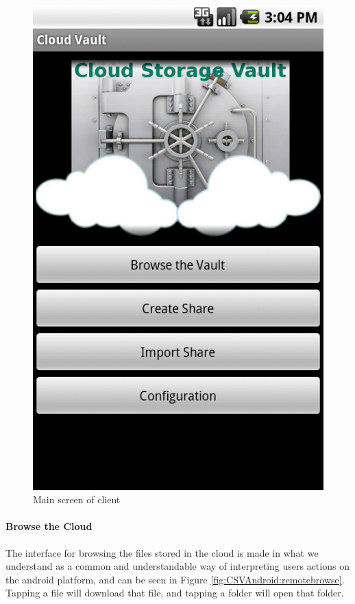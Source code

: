 \documentclass[pdftex,english,10pt,b5paper,twoside]{book}
\begin{document}
\begin{figure}[h!]
    \centering
    \includegraphics[scale=0.4]{client-mainscreen.png}
    \caption{Main screen of client}
    \label{fig:CSVAndroid:mainscreen}
\end{figure}

\paragraph{Browse the Cloud}

The interface for browsing the files stored in the cloud is made in what we
understand as a common and understandable way of interpreting users actions on
the android platform, and can be seen in Figure
\ref{fig:CSVAndroid:remotebrowse}. Tapping a file will download that file, and
tapping a folder will open that folder.
\end{document}
